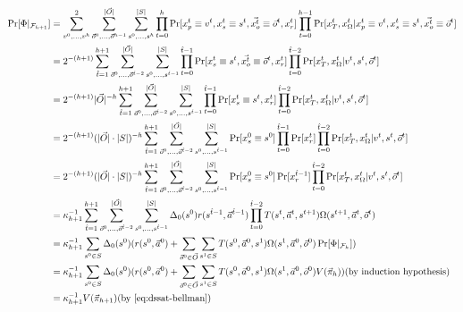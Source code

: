 \begin{tcolorbox}[colback=white]
    \begin{align*}
        \Pr[\Phi|_{\mathcal{F}_{h+1}}] & =\sum_{v^0,\ldots,v^h}^{2}\sum_{\vec{o}^0,\ldots,\vec{o}^{h-1}}^{|\vec{O}|}\sum_{s^0,\ldots,s^h}^{|S|}\prod_{t=0}^h\Pr[x_p^t \equiv v^t,x_s^t \equiv s^t,\vec{x_o^t} \equiv \vec{o}^t,x_r^t]\prod_{t=0}^{h-1}\Pr[x_T^t,x_\Omega^t|x_p^t \equiv v^t,x_s^t \equiv s^t,\vec{x_o^t}\equiv \vec{o}^t] \\
                                       & =2^{-(h+1)}\sum_{\hat{t}=1}^{h+1}\sum_{\vec{o}^0,\ldots,\vec{o}^{\hat{t}-2}}^{|\vec{O}|}\sum_{s^0,\ldots,s^{\hat{t}-1}}^{|S|}\prod_{t=0}^{\hat{t}-1}\Pr[x_s^t \equiv s^t,\vec{x_o^t}\equiv\vec{o}^t,x_r^t]\prod_{t=0}^{\hat{t}-2}\Pr[x_T^t,x_\Omega^t|v^t,s^t,\vec{o}^t]                         \\
                                       & =2^{-(h+1)}|\vec{O}|^{-h}\sum_{\hat{t}=1}^{h+1}\sum_{\vec{o}^0,\ldots,\vec{o}^{\hat{t}-2}}^{|\vec{O}|}\sum_{s^0,\ldots,s^{\hat{t}-1}}^{|S|}\prod_{t=0}^{\hat{t}-1}\Pr[x_s^t \equiv s^t,x_r^t]\prod_{t=0}^{\hat{t}-2}\Pr[x_T^t,x_\Omega^t|v^t,s^t,\vec{o}^t]                                      \\
                                       & =2^{-(h+1)}(|\vec{O}|\cdot|S|)^{-h}\sum_{\hat{t}=1}^{h+1}\sum_{\vec{o}^0,\ldots,\vec{o}^{\hat{t}-2}}^{|\vec{O}|}\sum_{s^0,\ldots,s^{\hat{t}-1}}^{|S|}\Pr[x_s^0 \equiv s^0]\prod_{t=0}^{\hat{t}-1}\Pr[x_r^t]\prod_{t=0}^{\hat{t}-2}\Pr[x_T^t,x_\Omega^t|v^t,s^t,\vec{o}^t]                        \\
                                       & =2^{-(h+1)}(|\vec{O}|\cdot|S|)^{-h}\sum_{\hat{t}=1}^{h+1}\sum_{\vec{o}^0,\ldots,\vec{o}^{\hat{t}-2}}^{|\vec{O}|}\sum_{s^0,\ldots,s^{\hat{t}-1}}^{|S|}\Pr[x_s^0 \equiv s^0]\Pr[x_r^{\hat{t}-1}]\prod_{t=0}^{\hat{t}-2}\Pr[x_T^t,x_\Omega^t|v^t,s^t,\vec{o}^t]                                     \\
                                       & =\kappa_{h+1}^{-1}\sum_{\hat{t}=1}^{h+1}\sum_{\vec{o}^0,\ldots,\vec{o}^{\hat{t}-2}}^{|\vec{O}|}\sum_{s^0,\ldots,s^{\hat{t}-1}}^{|S|}\Delta_0(s^0)r(s^{\hat{t}-1},\vec{a}^{\hat{t}-1})\prod_{t=0}^{\hat{t}-2}T(s^t,\vec{a}^t,s^{t+1})\Omega(s^{t+1},\vec{a}^t,\vec{o}^t)                          \\
                                       & =\kappa_{h+1}^{-1}\sum_{s^0\in S}\Delta_0(s^0)(r(s^0,\vec{a}^0)+\sum_{\vec{o}^0\in \vec{O}}\sum_{s^1\in S}T(s^0,\vec{a}^0,s^1)\Omega(s^1,\vec{a}^0,\vec{o}^0)\Pr[\Phi|_{\mathcal{F}_h}])                                                                                                         \\
                                       & =\kappa_{h+1}^{-1}\sum_{s^0\in S}\Delta_0(s^0)(r(s^0,\vec{a}^0)+\sum_{\vec{o}^0\in \vec{O}}\sum_{s^1\in S}T(s^0,\vec{a}^0,s^1)\Omega(s^1,\vec{a}^0,\vec{o}^0)V(\vec{\pi}_h))\text{(by induction hypothesis)}                                                                                     \\
                                       & =\kappa_{h+1}^{-1} V(\vec{\pi}_{h+1})\text{(by~\cref{eq:dssat-bellman})}
    \end{align*}
\end{tcolorbox}